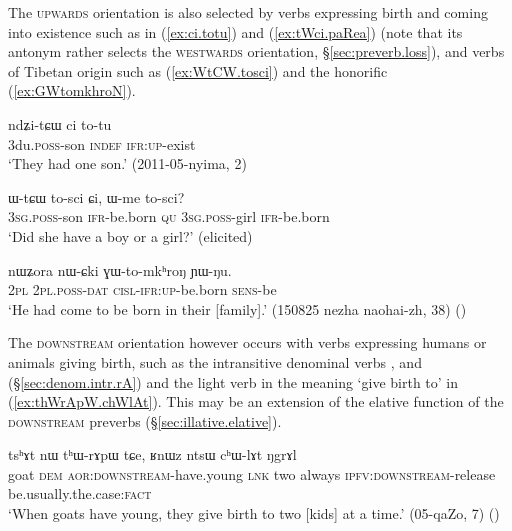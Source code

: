 The \textsc{upwards} orientation is also selected by verbs expressing birth and coming into existence such as  in (\ref{ex:ci.totu}) and (\ref{ex:tWci.paRea}) (note that its antonym  rather selects the \textsc{westwards} orientation, §\ref{sec:preverb.loss}), and verbs of Tibetan origin such as  (\ref{ex:WtCW.tosci}) and the honorific  (\ref{ex:GWtomkhroN}).

\begin{exe}
\ex \label{ex:ci.totu}
\gll  ndʑi-tɕɯ ci to-tu \\
3du.\textsc{poss}-son \textsc{indef} \textsc{ifr}:\textsc{up}-exist \\
\glt `They had one son.' (2011-05-nyima, 2)
\end{exe}

\begin{exe}
\ex \label{ex:WtCW.tosci}
\gll ɯ-tɕɯ to-sci ɕi, ɯ-me to-sci? \\
\textsc{3sg}.\textsc{poss}-son \textsc{ifr}-be.born \textsc{qu} \textsc{3sg}.\textsc{poss}-girl \textsc{ifr}-be.born \\
\glt `Did she have a boy or a girl?' (elicited)
\end{exe}

\begin{exe}
\ex \label{ex:GWtomkhroN}
\gll nɯʑora nɯ-ɕki ɣɯ-to-mkʰroŋ ɲɯ-ŋu.  \\
\textsc{2pl} \textsc{2pl}.\textsc{poss}-\textsc{dat} \textsc{cisl}-\textsc{ifr}:\textsc{up}-be.born \textsc{sens}-be \\
\glt `He had come to be born in their [family].' (150825 nezha naohai-zh, 38) ()
\end{exe}

The \textsc{downstream} orientation however occurs with verbs expressing humans or animals giving birth, such as the intransitive denominal verbs ,  and  (§\ref{sec:denom.intr.rA}) and the light verb  in the meaning `give birth to' in (\ref{ex:thWrApW.chWlAt}). This may be an extension of the elative function of the \textsc{downstream} preverbs (§\ref{sec:illative.elative}).

\begin{exe}
\ex \label{ex:thWrApW.chWlAt}
\gll tsʰɤt nɯ tʰɯ-rɤpɯ tɕe, ʁnɯz ntsɯ cʰɯ-lɤt ŋgrɤl \\
goat \textsc{dem} \textsc{aor}:\textsc{downstream}-have.young \textsc{lnk} two always \textsc{ipfv}:\textsc{downstream}-release be.usually.the.case:\textsc{fact} \\
\glt `When goats have young, they give birth to two [kids] at a time.' (05-qaZo, 7)
()
\end{exe}

